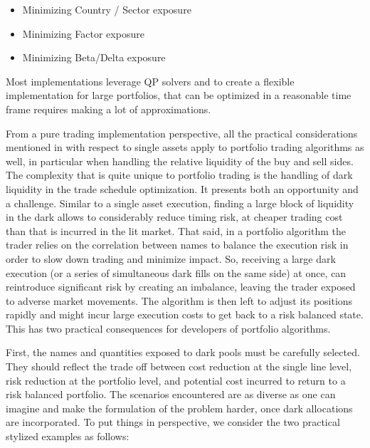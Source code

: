         \begin{itemize}
        \item Minimizing Country / Sector exposure
        \item Minimizing Factor exposure
        \item Minimizing Beta/Delta exposure
        \end{itemize}

Most implementations leverage QP solvers and to create a flexible implementation for large portfolios, that can be optimized in a reasonable time frame requires making a lot of approximations.


From a pure trading implementation perspective, all the practical considerations mentioned in with respect to single assets apply to portfolio trading algorithms as well, in particular when handling the relative liquidity of the buy and sell sides. The complexity that is quite unique to portfolio trading is the handling of dark liquidity in the trade schedule optimization. It presents both an opportunity and a challenge. Similar to a single asset execution, finding a large block of liquidity in the dark allows to considerably reduce timing risk, at cheaper trading cost than that is incurred in the lit market. That said, in a portfolio algorithm the trader relies on the correlation between names to balance the execution risk in order to slow down trading and minimize impact. So, receiving a large dark execution (or a series of simultaneous dark fills on the same side) at once, can reintroduce significant risk by creating an imbalance, leaving the trader exposed to adverse market movements. The algorithm is then left to adjust its positions rapidly and might incur large execution costs to get back to a risk balanced state. This has two practical consequences for developers of portfolio algorithms. 


First, the names and quantities exposed to dark pools must be carefully selected. They should reflect the trade off between cost reduction at the single line level, risk reduction at the portfolio level, and potential cost incurred to return to a risk balanced portfolio. The scenarios encountered are as diverse as one can imagine and make the formulation of the problem harder, once dark allocations are incorporated. To put things in perspective, we consider the two practical stylized examples as follows:


